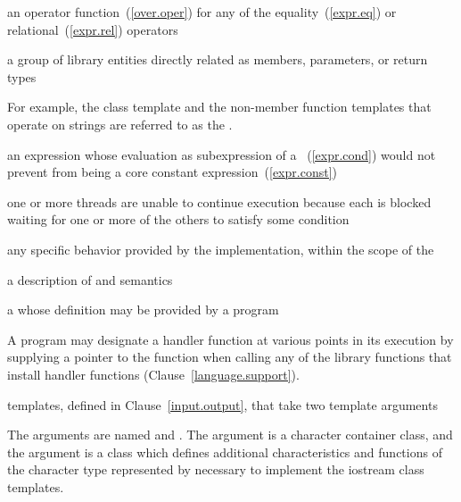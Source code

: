 %
an operator function~(\ref{over.oper}) for any of the equality~(\ref{expr.eq}) or
relational~(\ref{expr.rel}) operators

%
a group of library entities directly related as members, parameters, or
return types\\
\begin{note}
For example, the class template
and the non-member
function templates
that operate on
strings are referred to as the
.
\end{note}

%
an expression whose evaluation as subexpression of a
~(\ref{expr.cond}) would not prevent 
from being a core constant expression~(\ref{expr.const})

%
one or more threads are unable to continue execution because each is
blocked waiting for one or more of the others to satisfy some condition

%
any specific behavior provided by the implementation,
within the scope of the

%
a description of
and
semantics

%
a
whose definition may be provided by a \Cpp program\\
\begin{note}
A \Cpp program may designate a handler function at various points in its execution by
supplying a pointer to the function when calling any of the library functions that install
handler functions (Clause~\ref{language.support}).
\end{note}

templates, defined in Clause~\ref{input.output},
that take two template arguments\\
\begin{note}
The arguments are named
and
.
The argument
is a character container class,
and the argument
is a class which defines additional characteristics and functions
of the character type represented by
necessary to implement the iostream class templates.
\end{note}

